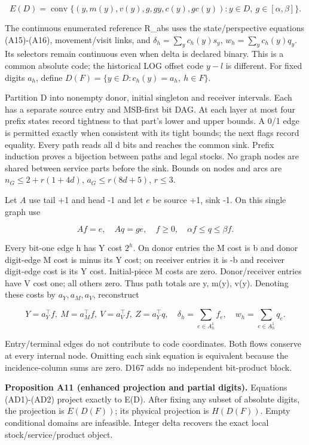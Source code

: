 \documentclass[
  american,
  11pt,
]{article}
\newcounter{none} %
\begin{document}
\[
E(D)=\operatorname{conv}\{(y,m(y),v(y),g,gy,c(y),gc(y)):y\in D,\ g\in[\alpha,\beta]\}.
\]

The continuous enumerated reference R\_\allowbreak{}abs uses the state/perspective
equations (A15)-(A16), movement/visit links, and
\(\delta_h=\sum_yc_h(y)s_y\), \(w_h=\sum_yc_h(y)q_y\). Its selectors
remain continuous even when delta is declared binary. This is a common
absolute code; the historical LOG offset code \(y-l\) is different. For
fixed digits \(a_h\), define \(D(F)=\{y\in D:c_h(y)=a_h,\ h\in F\}\).

Partition D into nonempty donor, initial singleton and receiver
intervals. Each has a separate source entry and MSB-first bit DAG. At
each layer at most four prefix states record tightness to that part's
lower and upper bounds. A 0/1 edge is permitted exactly when consistent
with its tight bounds; the next flags record equality. Every path reads
all d bits and reaches the common sink. Prefix induction proves a
bijection between paths and legal stocks. No graph nodes are shared
between service parts before the sink. Bounds on nodes and arcs are
\(n_G\le2+r(1+4d)\), \(a_G\le r(8d+5)\), \(r\le3\).

Let \(A\) use tail +1 and head -1 and let \(e\) be source +1, sink -1.
On this single graph use

\[
Af=e,\quad Aq=ge,\quad f\ge0,\quad \alpha f\le q\le\beta f.
\tag{AD1}
\]

Every bit-one edge h has Y cost \(2^h\). On donor entries the M cost is
b and donor digit-edge M cost is minus its Y cost; on receiver entries
it is -b and receiver digit-edge cost is its Y cost. Initial-piece M
costs are zero. Donor/receiver entries have V cost one; all others zero.
Thus path totals are y, m(y), v(y). Denoting these costs by
\(a_Y,a_M,a_V\), reconstruct

\[
Y=a_Y^\top f,\ M=a_M^\top f,\ V=a_V^\top f,\ Z=a_Y^\top q,
\quad \delta_h=\sum_{e\in A_h^1}f_e,\quad w_h=\sum_{e\in A_h^1}q_e.
\tag{AD2}
\]

Entry/terminal edges do not contribute to code coordinates. Both flows
conserve at every internal node. Omitting each sink equation is
equivalent because the incidence-column sums are zero. D167 adds no
independent bit-product block.


\textbf{Proposition A11 (enhanced projection and partial digits).}
Equations (AD1)-(AD2) project exactly to E(D). After fixing any subset
of absolute digits, the projection is \(E(D(F))\); its physical
projection is \(H(D(F))\). Empty conditional domains are infeasible.
Integer delta recovers the exact local stock/service/product object.
\end{document}
